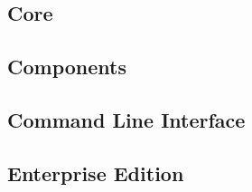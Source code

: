 \subsection{Core}
\subsection{Components}
\subsection{Command Line Interface}
\subsection{Enterprise Edition}